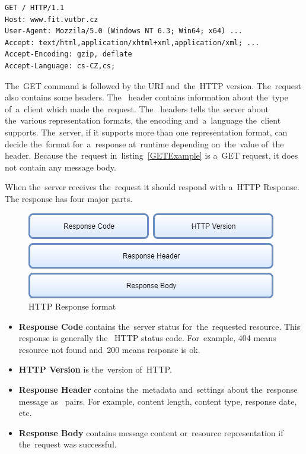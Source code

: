\vspace{2mm}
\begin{lstlisting}[caption=A~sample of~a~simplified GET Request.,
label=GETExample, language=HTML] 
GET / HTTP/1.1
Host: www.fit.vutbr.cz
User-Agent: Mozzila/5.0 (Windows NT 6.3; Win64; x64) ...
Accept: text/html,application/xhtml+xml,application/xml; ...
Accept-Encoding: gzip, deflate
Accept-Language: cs-CZ,cs;
\end{lstlisting}

The~GET command is followed by the URI
and~the~HTTP version. The~request also contains some headers.
The~ header contains information about the~type of~a~client which
made the~request. The~ headers tells the~server about the~various
representation formats, the encoding and~a~language the~client supports.
The~server, if it supports more than one representation format, can decide
the~format for~a~response at~runtime depending on~the~value
of~the~ header. Because the~request in~listing~\ref{GETExample} is
a~GET request, it does not contain any message body.

When the~server receives the~request it should respond with a~HTTP Response.
The response has four major parts.

\begin{figure}[!hbt]
	\centering
	\includegraphics[scale=0.65]{./obrazky-figures/html-response.png}
	\caption{HTTP Response format}
	\label{HTTPResponseFormat}
\end{figure}

\begin{itemize}
  \item \textbf{Response Code} contains the~server status for~the~requested
  resource. This response is generally the~ HTTP status code.
  For~example, 404 means resource not found and~200 means
  response is ok.
  \item \textbf{HTTP Version} is the~version of~HTTP.
  \item \textbf{Response Header} contains the~metadata and~settings about
  the~response message as~ pairs. For example, content length,
  content type, response date, etc.
  \item \textbf{Response Body} contains message content or~resource
  representation if the~request was successful.
\end{itemize}



